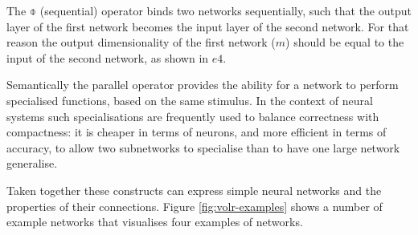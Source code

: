 The $\obar$ (sequential) operator binds two networks sequentially,
such that the output layer of the first network becomes the input layer 
of the second network.
For that reason the output dimensionality of the first network ($m$) should 
be equal to the input of the second network, as shown in $e4$.

Semantically the parallel operator provides the ability for a network to
perform specialised functions, based on the same stimulus.
In the context of neural systems such specialisations are frequently used
to balance correctness with compactness: it is cheaper in terms of neurons,
and more efficient in terms of accuracy,
to allow two subnetworks to specialise than to have one large network 
generalise.

\begin{comment} %
In the other end, the two layers are merged such that each output neuron
is represented individually in a population with the size $e + e'$.
By not entangling the output dimensions, the following layers can choose
to ignore parts of the input, irrespective of the other parallel layer.
This parallelisation represents the duplication that occurs
in neural circuits, where structurally similar sub-networks, that are
fed the same stimuli, appear to contribute with semantically different
information (see \ref{sec:ref}).
\end{comment}

Taken together these constructs can express simple neural networks and
the properties of their connections. 
Figure \ref{fig:volr-examples} shows a number of example networks
that visualises four examples of networks. 



\FloatBarrier
